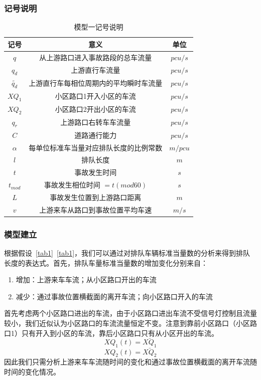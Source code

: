 \documentclass{cumcmart}
\begin{document}
\subsubsection{记号说明}
\begin{table}[h]
\centering
\begin{tabular}{|c|c|c|}
\hline
{记号}& {意义}& {单位} \\
\hline
$q$& 从上游路口进入事故路段的总车流量& $ {pcu/s}$ \\
\hline
$q_{d}$ & 上游直行车流量& $ {pcu/s}$ \\
\hline
$\tilde{q_{d}}$& 上游直行车每相位周期内的平均瞬时车流量& $ {pcu/s}$ \\
\hline
${XQ}_{1}$& 小区路口1开入小区的车流& $ {pcu/s}$ \\
\hline
${XQ}_{2}$& 小区路口2开出小区的车流& $ {pcu/s}$ \\
\hline
$q_{r}$& 上游路口右转车车流量& $ {pcu/s}$ \\
\hline
$ {C}$& 道路通行能力& $ {pcu/s}$ \\
\hline
$ {\alpha}$& 每单位标准车当量对应排队长度的比例常数& $ {m/pcu}$ \\
\hline
$l$& 排队长度& $ {m}$ \\
\hline
$t$& 事故发生时间& $ {s}$ \\
\hline
$t_{mod}$& 事故发生相位时间 $=t (mod 60)$& $ {s}$ \\
\hline
$ {L}$& 事故发生位置到上游路口距离& $ {m}$ \\
\hline
$v$& 上游来车从路口到事故位置平均车速& $ {m/s}$ \\
\hline
\end{tabular}
\caption{模型一记号说明}
\end{table}

\subsubsection{模型建立}
根据假设\tablename~\ref{tab1}\tablename~\ref{tab1}，我们可以通过对排队车辆标准当量数的分析来得到排队长度的表达式。首先，排队车量标准当量数的增加变化分别来自：

\begin{enumerate}
\item 增加：上游来车车流；从小区路口开出的车流
\item 减少：通过事故位置横截面的离开车流；向小区路口开入的车流
\end{enumerate}

首先考虑两个小区路口进出的车流，由于小区路口进出车流不受信号灯控制且流量较小，我们近似认为小区路口的车流流量恒定不变。注意到靠前小区路口（小区路口1）只有开入到小区的车流，靠后小区路口只有从小区开出的车流。
\[
{XQ}_{1}(t)=\bar{{XQ}_{1}}
\]
\[
{XQ}_{2}(t)=\bar{{XQ}_{2}}
\]
因此我们只需分析上游来车车流随时间的变化和通过事故位置横截面的离开车流随时间的变化情况。
\end{document}
